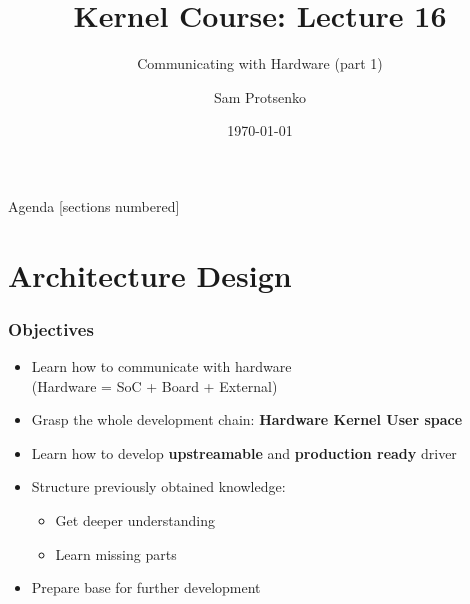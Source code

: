 \documentclass[aspectratio=169,usenames,dvipsnames]{beamer}
\title{Kernel Course: Lecture 16}
\subtitle{Communicating with Hardware (part 1)}
\date{\today}
\author{Sam Protsenko}
\institute{GlobalLogic}
\newcounter{cont}
\begin{document}

\maketitle

\begin{frame}{Agenda}
  [sections numbered]
  \tableofcontents[hideallsubsections]
\end{frame}

\section{Architecture Design}

\begin{frame}
  \frametitle{Objectives}
  \begin{itemize}
    \item Learn how to communicate with hardware \\
          (Hardware = SoC + Board + External)
    \item Grasp the whole development chain: \textbf{Hardware \textrightarrow{}
          Kernel \textrightarrow{} User space}
    \item Learn how to develop \textbf{upstreamable} and
          \textbf{production ready} driver
    \item Structure previously obtained knowledge:
    \begin{itemize}
      \item Get deeper understanding
      \item Learn missing parts
    \end{itemize}
    \item Prepare base for further development
  \end{itemize}
\end{frame}
\end{document}
